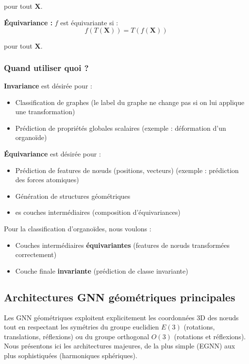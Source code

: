 pour tout $\mathbf{X}$.

\textbf{Équivariance :}
$f$ est équivariante si :
\[
f(T(\mathbf{X})) = T(f(\mathbf{X}))
\]

pour tout $\mathbf{X}$.

\subsubsection{Quand utiliser quoi ?}

\textbf{Invariance} est désirée pour :
\begin{itemize}
    \item Classification de graphes (le label du graphe ne change pas si on lui applique une transformation)
    \item Prédiction de propriétés globales scalaires (exemple : déformation d'un organoïde)
\end{itemize}

\textbf{Équivariance} est désirée pour :
\begin{itemize}
    \item Prédiction de features de nœuds (positions, vecteurs) (exemple : prédiction des forces atomiques)
    \item Génération de structures géométriques
    \item es couches intermédiaires (composition d'équivariances)
\end{itemize}

Pour la classification d'organoïdes, nous voulons :
\begin{itemize}
    \item Couches intermédiaires \textbf{équivariantes} (features de nœuds transformées correctement)
    \item Couche finale \textbf{invariante} (prédiction de classe invariante)
\end{itemize}

\subsection{Architectures GNN géométriques principales}

Les GNN géométriques exploitent explicitement les coordonnées 3D des nœuds tout en respectant les symétries du groupe euclidien $E(3)$ (rotations, translations, réflexions) ou du groupe orthogonal $O(3)$ (rotations et réflexions). Nous présentons ici les architectures majeures, de la plus simple (EGNN) aux plus sophistiquées (harmoniques sphériques).

